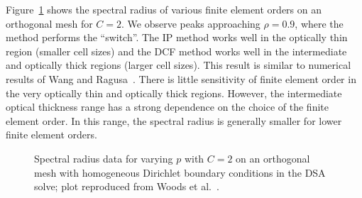 \documentclass[12pt]{article}
\begin{document}
Figure~\ref{fig:MIPHOC2Ortho} shows the spectral radius of various finite element orders on an orthogonal mesh for $C=2$. We observe peaks approaching $\rho = 0.9$, where the method performs the ``switch''. The IP method works well in the optically thin region (smaller cell sizes) and the DCF method works well in the intermediate and optically thick regions (larger cell sizes). This result is similar to numerical results of Wang and Ragusa~\cite{WangRagusaDSA}. There is little sensitivity of finite element order in the very optically thin and optically thick regions. However, the intermediate optical thickness range has a strong dependence on the choice of the finite element order. In this range, the spectral radius is generally smaller for lower finite element orders.

\begin{figure}[!hbt]
\centering
{}
\caption{Spectral radius data for varying $p$ with $C=2$ on an orthogonal mesh with homogeneous Dirichlet boundary conditions in the DSA solve; plot reproduced from Woods et al.~\cite{WoodsDSA}.}
\label{fig:MIPHOC2Ortho}
\end{figure}
\end{document}
